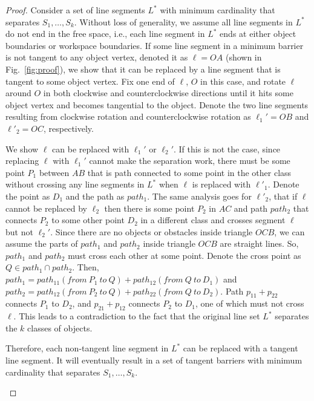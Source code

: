 \begin{proof}

Consider a set of line segments $L^*$ with minimum cardinality that separates $S_1,\dots, S_k$. 
Without loss of generality, we assume all line segments in $L^*$ do not end in the free space, i.e., each line segment in $L^*$ ends
at either object boundaries or workspace boundaries.
If some line segment in a minimum barrier is not tangent to any object vertex, denoted it as $\ell=OA$ (shown in Fig.~\ref{fig:proof}), we show that it can be replaced by a line segment that is tangent to some object vertex. 
%
Fix one end of $\ell$, $O$ in this case, and rotate $\ell$ around $O$ in both clockwise and counterclockwise directions until it hits some object vertex and becomes tangential to the object.
%
Denote the two line segments resulting from clockwise rotation and counterclockwise rotation as $\ell_1'=OB$ and $\ell'_2=OC$, respectively. 

We show $\ell$ can be replaced with $\ell_1'$ or $\ell_2'$. 
If this is not the case,
since replacing $\ell$ with $\ell_1'$ cannot make the separation work, there must be some point $P_1$ between $AB$ that is path connected to some point in the other class without crossing any line segments in $L^*$ when $\ell$ is replaced with $\ell'_1$. Denote the point as $D_1$ and the path as $path_1$. 
The same analysis goes for $\ell'_2$, that if $\ell$ cannot be replaced by $\ell_2$ then there is some point $P_2$ in $AC$ and path $path_2$ that connects $P_2$ to some other point $D_2$ in a different class and crosses segment $\ell$ but not $\ell_2'$. 
Since there are no objects or obstacles inside triangle $OCB$, we can assume the parts of $path_1$ and $path_2$ inside triangle $OCB$ are straight lines.
So, $path_1$ and $path_2$ must cross each other at some point. 
Denote the cross point as $Q\in path_1 \cap path_2$. 
Then, $path_1 = path_{11} (from\ P_1\ to\ Q) + path_{12} (from\ Q\ to\ D_1)$ and $path_2 = path_{12} (from\ P_2\ to\ Q) + path_{22} (from\ Q\ to\ D_2)$. 
Path $p_{11} + p_{22}$ connects $P_1$ to $D_2$, and $p_{21} + p_{12}$ connects $P_2$ to $D_1$, one of which must not cross $\ell$. 
This leads to a contradiction to the fact that the original line set $L^*$ separates the $k$ classes of objects.

Therefore, each non-tangent line segment in $L^*$ can be replaced with a tangent line segment. 
It will eventually result in a set of tangent barriers with minimum cardinality that separates $S_1,\dots,S_k$.
\begin{figure}[ht]
    \vspace{-2mm}
    \centering
{}
\end{figure}
\end{proof}
